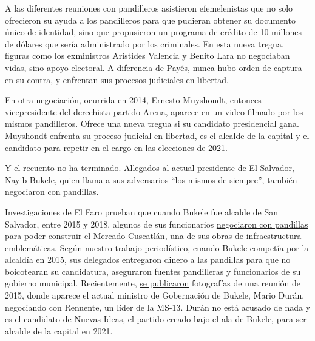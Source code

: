 A las diferentes reuniones con pandilleros asistieron efemelenistas que
no solo ofrecieron su ayuda a los pandilleros para que pudieran obtener
su documento único de identidad, sino que propusieron un
\href{https://elfaro.net/es/201610/salanegra/19473/FMLN-ofreci\%C3\%B3-a-las-pandillas-un-programa-de-cr\%C3\%A9ditos-de-10-millones-de-d\%C3\%B3lares.htm}{programa
de crédito} de 10 millones de dólares que sería administrado por los
criminales. En esta nueva tregua, figuras como los exministros Arístides
Valencia y Benito Lara no negociaban vidas, sino apoyo electoral. A
diferencia de Payés, nunca hubo orden de captura en su contra, y
enfrentan sus procesos judiciales en libertad.

En otra negociación, ocurrida en 2014, Ernesto Muyshondt, entonces
vicepresidente del derechista partido Arena, aparece en un
\href{https://elfaro.net/es/201603/video/18213/Arena-prometi\%C3\%B3-a-las-pandillas-una-nueva-tregua-si-ganaba-la-presidencia.htm}{video
filmado} por los mismos pandilleros. Ofrece una nueva tregua si su
candidato presidencial gana. Muyshondt enfrenta su proceso judicial en
libertad, es el alcalde de la capital y el candidato para repetir en el
cargo en las elecciones de 2021.

Y el recuento no ha terminado. Allegados al actual presidente de El
Salvador, Nayib Bukele, quien llama a sus adversarios ``los mismos de
siempre'', también negociaron con pandillas.

Investigaciones de El Faro prueban que cuando Bukele fue alcalde de San
Salvador, entre 2015 y 2018, algunos de sus funcionarios
\href{https://elfaro.net/es/201806/el_salvador/22148/Nayib-Bukele-tambi\%C3\%A9n-pact\%C3\%B3-con-pandillas.htm}{negociaron
con pandillas} para poder construir el Mercado Cuscatlán, una de sus
obras de infraestructura emblemáticas. Según nuestro trabajo
periodístico, cuando Bukele competía por la alcaldía en 2015, sus
delegados entregaron dinero a las pandillas para que no boicotearan su
candidatura, aseguraron fuentes pandilleras y funcionarios de su
gobierno municipal. Recientemente,
\href{https://elfaro.net/es/202007/el_salvador/24612/Nueva-informaci\%C3\%B3n-de-la-reuni\%C3\%B3n-entre-Mario-Dur\%C3\%A1n-y-Renuente-de-la-MS-13.htm}{se
publicaron} fotografías de una reunión de 2015, donde aparece el actual
ministro de Gobernación de Bukele, Mario Durán, negociando con Renuente,
un líder de la MS-13. Durán no está acusado de nada y es el candidato de
Nuevas Ideas, el partido creado bajo el ala de Bukele, para ser alcalde
de la capital en 2021.


